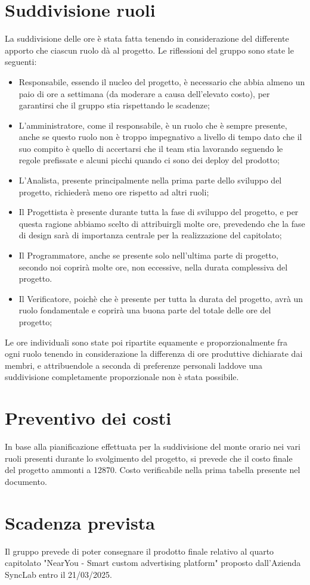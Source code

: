 \documentclass[10pt]{article}
\begin{document}
\section{Suddivisione ruoli}
La suddivisione delle ore è stata fatta tenendo in considerazione del differente apporto che ciascun ruolo dà al progetto. Le riflessioni del gruppo sono state le seguenti:
\begin{itemize}
    \item Responsabile, essendo il nucleo del progetto, è necessario che abbia almeno un paio di ore a settimana (da moderare a causa dell'elevato costo), per garantirsi che il gruppo stia rispettando le scadenze;
    \item L'amministratore, come il responsabile, è un ruolo che è sempre presente, anche se questo ruolo non è troppo impegnativo a livello di tempo dato che il suo compito è quello di accertarsi che il team stia lavorando seguendo le regole prefissate e alcuni picchi quando ci sono dei deploy del prodotto;
    \item L'Analista, presente principalmente nella prima parte dello sviluppo del progetto, richiederà meno ore rispetto ad altri ruoli;
    \item Il Progettista è presente durante tutta la fase di sviluppo del progetto, e per questa ragione abbiamo scelto di attribuirgli molte ore, prevedendo che la fase di design sarà di importanza centrale per la realizzazione del capitolato;
    \item Il Programmatore, anche se presente solo nell'ultima parte di progetto, secondo noi coprirà molte ore, non eccessive, nella durata complessiva del progetto.
    \item Il Verificatore, poichè che è presente per tutta la durata del progetto, avrà un ruolo fondamentale e coprirà una buona parte del totale delle ore del progetto;
\end{itemize}
Le ore individuali sono state poi ripartite equamente e proporzionalmente fra ogni ruolo tenendo in considerazione la differenza di ore produttive dichiarate dai membri, e attribuendole a seconda di preferenze personali laddove una suddivisione completamente proporzionale non è stata possibile.

\section{Preventivo dei costi}
In base alla pianificazione effettuata per la suddivisione del monte orario nei vari ruoli presenti durante lo svolgimento del progetto, si prevede che il costo finale del progetto ammonti a 12870\texteuro . Costo verificabile nella prima tabella presente nel documento.
\section{Scadenza prevista}
Il gruppo prevede di poter consegnare il prodotto finale relativo al quarto capitolato "NearYou - Smart custom advertising platform" proposto dall'Azienda SyncLab entro il 21/03/2025.
\end{document}
